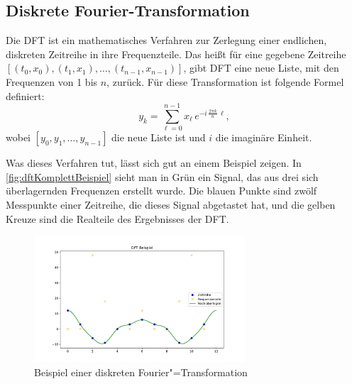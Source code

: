 \subsection{Diskrete Fourier-Transformation}
Die \ac{DFT} ist ein mathematisches Verfahren zur Zerlegung einer endlichen, diskreten Zeitreihe in ihre Frequenzteile. Das heißt für eine gegebene Zeitreihe $[(t_0,x_0),(t_1,x_1),\ldots,(t_{n-1},x_{n-1})]$, gibt \acs{DFT} eine neue Liste, mit den Frequenzen von 1 bis $n$, zurück. Für diese Transformation ist folgende Formel definiert:
\[y_k=\sum_{\ell=0}^{n-1}x_\ell\,e^{-i\,\tfrac{2\pi k}{n}\,\ell},\]
wobei $[y_0,y_1,\ldots,y_{n-1}]$ die neue Liste ist und $i$ die imaginäre Einheit.

Was dieses Verfahren tut, lässt sich gut an einem Beispiel zeigen. In \autoref{fig:dftKomplettBeispiel} sieht man in Grün ein Signal, das aus drei sich überlagernden Frequenzen erstellt wurde. Die blauen Punkte sind zwölf Messpunkte einer Zeitreihe, die dieses Signal abgetastet hat, und die gelben Kreuze sind die Realteile des Ergebnisses der \acs{DFT}. 
\begin{figure}[bth] 
  \centering
  \includegraphics[width=0.7\textwidth]{Graphics/DFTExample1.pdf}
  \caption{Beispiel einer diskreten Fourier"=Transformation}
  \label{fig:dftKomplettBeispiel}
\end{figure}

